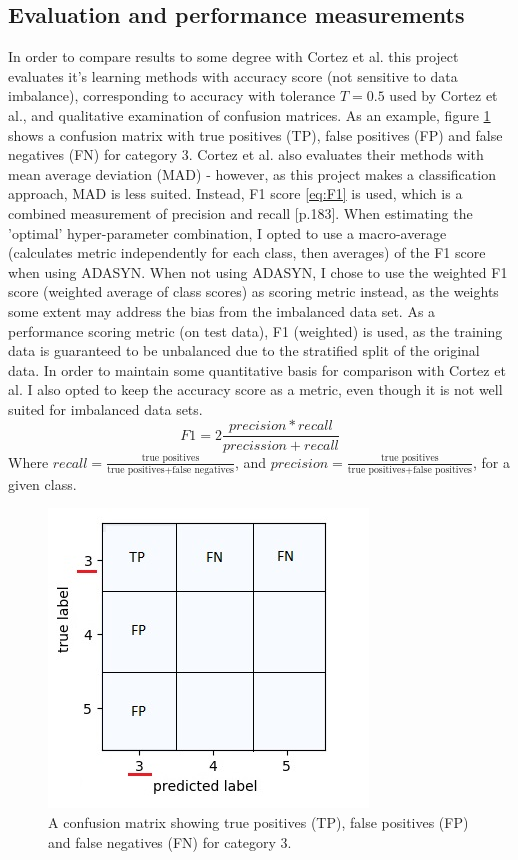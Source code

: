 \documentclass[%
oneside,                 %
final,                   %
10pt]{article}
\begin{document}
\subsection{Evaluation and performance measurements} \label{evaluation}
In order to compare results to some degree with Cortez et al. this project evaluates it's learning methods with accuracy score (not sensitive to data imbalance), corresponding to accuracy with tolerance $T=0.5$ used by Cortez et al.,  and qualitative examination of confusion matrices. As an example, figure \ref{fig:confusion} shows a confusion matrix with true positives (TP), false positives (FP) and false negatives (FN) for category $3$.  Cortez et al. also evaluates their methods with mean average deviation (MAD) \citep{CortezPaulo} - however, as this project makes a classification approach, MAD is less suited. Instead, F1 score \eqref{eq:F1} is used, which is a combined measurement of precision and recall \citep{MLMurphy}[p.183]. When estimating the 'optimal' hyper-parameter combination, I opted to use a macro-average (calculates metric independently for each class, then averages) of the F1 score when using ADASYN. When not using ADASYN, I chose to use the weighted F1 score (weighted average of class scores) as scoring metric instead, as the weights some extent may address the bias from the imbalanced data set. As a performance scoring metric (on test data), F1 (weighted) is used, as the training data is guaranteed to be unbalanced due to the stratified split of the original data. In order to maintain some quantitative basis for comparison with Cortez et al. I also opted to keep the accuracy score as a metric, even though it is not well suited for imbalanced data sets.
\begin{equation}
F1=2 \frac{ precision * recall}{precission + recall}
\label{eq:F1}
\end{equation}
Where $recall = \frac{\text{true positives}}{\text{true positives} + \text{false negatives}} $, and $precision = \frac{\text{true positives}}{\text{true positives} + \text{false positives}} $, for a given class.


\begin{figure}[!h]
        \centering 
         \includegraphics[scale=0.8]{confusion.jpg} 
        \caption{A confusion matrix showing true positives (TP), false positives (FP) and false negatives (FN) for category $3$.}
        \label{fig:confusion}   
\end{figure}  
\end{document}
